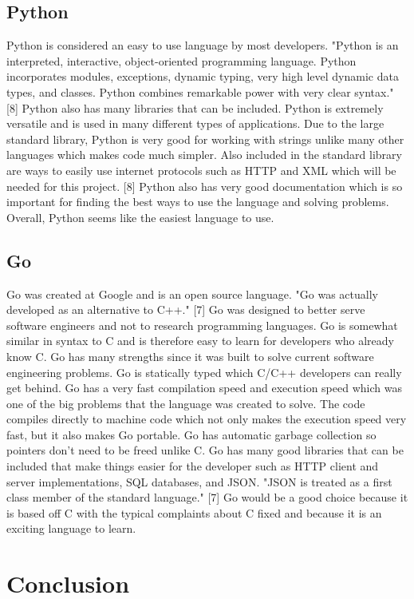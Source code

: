 \documentclass[letterpaper,10pt,draftclsnofoot,onecolumn,]{article}
\begin{document}
\subsection{Python}
Python is considered an easy to use language by most developers. "Python is an interpreted, interactive, object-oriented programming language. Python incorporates modules, exceptions, dynamic typing, very high level dynamic data types, and classes. Python combines remarkable power with very clear syntax." [8] Python also has many libraries that can be included. Python is extremely versatile and is used in many different types of applications. Due to the large standard library, Python is very good for working with strings unlike many other languages which makes code much simpler. Also included in the standard library are ways to easily use internet protocols such as HTTP and XML which will be needed for this project. [8] Python also has very good documentation which is so important for finding the best ways to use the language and solving problems. Overall, Python seems like the easiest language to use.

\subsection{Go}
Go was created at Google and is an open source language. "Go was actually developed as an alternative to C++." [7] Go was designed to better serve software engineers and not to research programming languages. Go is somewhat similar in syntax to C and is therefore easy to learn for developers who already know C. Go has many strengths since it was built to solve current software engineering problems. Go is statically typed which C/C++ developers can really get behind. Go has a very fast compilation speed and execution speed which was one of the big problems that the language was created to solve. The code compiles directly to machine code which not only makes the execution speed very fast, but it also makes Go portable. Go has automatic garbage collection so pointers don't need to be freed unlike C. Go has many good libraries that can be included that make things easier for the developer such as HTTP client and server implementations, SQL databases, and JSON. "JSON is treated as a first class member of the standard language." [7] Go would be a good choice because it is based off C with the typical complaints about C fixed and because it is an exciting language to learn.

\section{Conclusion}
\end{document}
